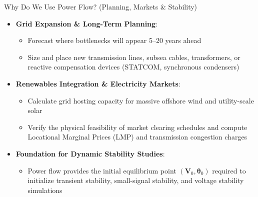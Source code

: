\begin{frame}{Why Do We Use Power Flow? (Planning, Markets \& Stability)}
    \begin{itemize}
        \item \textbf{Grid Expansion \& Long-Term Planning}:
        \begin{itemize}
            \item Forecast where bottlenecks will appear 5--20 years ahead
            \item Size and place new transmission lines, subsea cables, transformers, or reactive compensation devices (STATCOM, synchronous condensers)
        \end{itemize}
        \vspace{0.15cm}
        \item \textbf{Renewables Integration \& Electricity Markets}:
        \begin{itemize}
            \item Calculate grid hosting capacity for massive offshore wind and utility-scale solar
            \item Verify the physical feasibility of market clearing schedules and compute Locational Marginal Prices (LMP) and transmission congestion charges
        \end{itemize}
        \vspace{0.15cm}
        \item \textbf{Foundation for Dynamic Stability Studies}:
        \begin{itemize}
            \item Power flow provides the initial equilibrium point $(\mathbf{V}_0, \boldsymbol{\theta}_0)$ required to initialize transient stability, small-signal stability, and voltage stability simulations
        \end{itemize}
    \end{itemize}
\end{frame}

